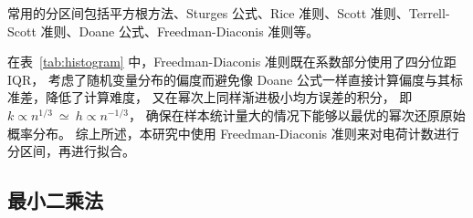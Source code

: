 常用的分区间包括平方根方法、Sturges 公式、Rice 准则、Scott 准则、Terrell-Scott 准则、Doane 公式、Freedman-Diaconis 准则等。

\begin{table}
    \centering
    \caption{多种分区间方法的比较}
    \label{tab:histogram}
\end{table}

在表~\ref{tab:histogram} 中，Freedman-Diaconis 准则既在系数部分使用了四分位距 IQR，
考虑了随机变量分布的偏度而避免像 Doane 公式一样直接计算偏度与其标准差，降低了计算难度，
又在幂次上同样渐进极小均方误差的积分\cite{freedmanHistogramDensityEstimator1981}，
即 $k\propto n^{1/3}\ \simeq\ h\propto n^{-1/3}$，
确保在样本统计量大的情况下能够以最优的幂次还原原始概率分布。
综上所述，本研究中使用 Freedman-Diaconis 准则来对电荷计数进行分区间，再进行拟合。

\subsection{最小二乘法}

